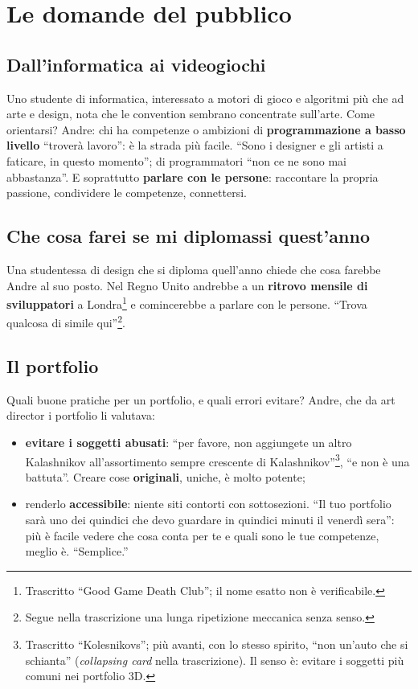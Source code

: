\section{Le domande del pubblico}
\label{sec:c2-4-domande}

\subsection{Dall'informatica ai videogiochi}

Uno studente di informatica, interessato a motori di gioco e algoritmi più che ad
arte e design, nota che le convention sembrano concentrate sull'arte. Come
orientarsi? Andre: chi ha competenze o ambizioni di \textbf{programmazione a basso
livello} ``troverà lavoro'': è la strada più facile. ``Sono i designer e gli
artisti a faticare, in questo momento''; di programmatori ``non ce ne sono mai
abbastanza''. E soprattutto \textbf{parlare con le persone}: raccontare la propria
passione, condividere le competenze, connettersi.

\subsection{Che cosa farei se mi diplomassi quest'anno}

Una studentessa di design che si diploma quell'anno chiede che cosa farebbe Andre al
suo posto. Nel Regno Unito andrebbe a un \textbf{ritrovo mensile di sviluppatori} a
Londra\footnote{Trascritto ``Good Game Death Club''; il nome esatto non è
verificabile.} e comincerebbe a parlare con le persone. ``Trova qualcosa di simile
qui''\footnote{Segue nella trascrizione una lunga ripetizione meccanica senza
senso.}.

\subsection{Il portfolio}

Quali buone pratiche per un portfolio, e quali errori evitare? Andre, che da art
director i portfolio li valutava:
\begin{itemize}
  \item \textbf{evitare i soggetti abusati}: ``per favore, non aggiungete un altro
        Kalashnikov all'assortimento sempre crescente di
        Kalashnikov''\footnote{Trascritto ``Kolesnikovs''; più avanti, con lo stesso
        spirito, ``non un'auto che si schianta'' (\emph{collapsing card} nella
        trascrizione). Il senso è: evitare i soggetti più comuni nei portfolio 3D.},
        ``e non è una battuta''. Creare cose \textbf{originali}, uniche, è molto
        potente;
  \item renderlo \textbf{accessibile}: niente siti contorti con sottosezioni.
        ``Il tuo portfolio sarà uno dei quindici che devo guardare in quindici
        minuti il venerdì sera'': più è facile vedere che cosa conta per te e quali
        sono le tue competenze, meglio è. ``Semplice.''
\end{itemize}

